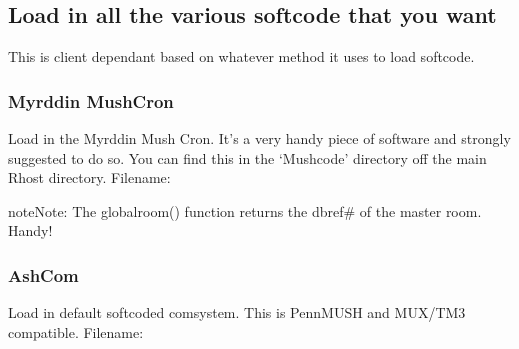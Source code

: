 \documentclass[letterpaper,10pt,english]{sphinxmanual}
\begin{document}
\subsection{Load in all the various softcode that you want}
\label{\detokenize{gettingstarted:load-in-all-the-various-softcode-that-you-want}}
\sphinxAtStartPar
This is client dependant based on whatever method it uses to load softcode.


\subsubsection{Myrddin MushCron}
\label{\detokenize{gettingstarted:myrddin-mushcron}}
\sphinxAtStartPar
Load in the Myrddin Mush Cron.
It’s a very handy piece of software and strongly suggested to do so.  You can find this in the ‘Mushcode’ directory off the main Rhost directory.
Filename:

\begin{sphinxVerbatim}[commandchars=\\\{\}]
\end{sphinxVerbatim}

\begin{sphinxadmonition}{note}{Note:}
\sphinxAtStartPar
The globalroom() function returns the dbref\# of the master room.  Handy!
\end{sphinxadmonition}

\begin{sphinxVerbatim}[commandchars=\\\{\}]
           
 
 
\end{sphinxVerbatim}


\subsubsection{AshCom}
\label{\detokenize{gettingstarted:ashcom}}
\sphinxAtStartPar
Load in default softcoded comsystem.  This is PennMUSH and MUX/TM3 compatible.
Filename:

\begin{sphinxVerbatim}[commandchars=\\\{\}]
\end{sphinxVerbatim}
\end{document}

